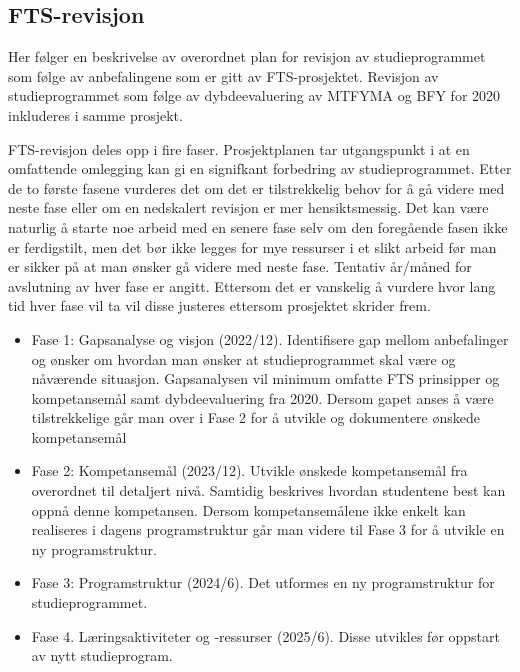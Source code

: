 \subsection{FTS-revisjon}
Her følger en beskrivelse av overordnet plan for revisjon av studieprogrammet som følge av anbefalingene som er gitt av FTS-prosjektet. Revisjon av studieprogrammet som følge av dybdeevaluering av MTFYMA og BFY for 2020 inkluderes i samme prosjekt.

FTS-revisjon deles opp i fire faser. Prosjektplanen tar utgangspunkt i at en omfattende omlegging kan gi en signifkant forbedring av studieprogrammet. Etter de to første fasene vurderes det om det er tilstrekkelig behov for å gå videre med neste fase eller om en nedskalert revisjon er mer hensiktsmessig. Det kan være naturlig å starte noe arbeid med en senere fase selv om den foregående fasen ikke er ferdigstilt, men det bør ikke legges for mye ressurser i et slikt arbeid før man er sikker på at man ønsker gå videre med neste fase. Tentativ år/måned for avslutning av hver fase er angitt. Ettersom det er vanskelig å vurdere hvor lang tid hver fase vil ta vil disse justeres ettersom prosjektet skrider frem.

\begin{itemize}
	\item Fase 1: Gapsanalyse og visjon (2022/12). Identifisere gap mellom anbefalinger og ønsker om hvordan man ønsker at studieprogrammet skal være og nåværende situasjon. Gapsanalysen vil minimum omfatte FTS prinsipper og kompetansemål samt dybdeevaluering fra 2020. Dersom gapet anses å være tilstrekkelige går man over i Fase 2 for å utvikle og dokumentere ønskede kompetansemål
	\item Fase 2: Kompetansemål (2023/12). Utvikle ønskede kompetansemål fra overordnet til detaljert nivå. Samtidig beskrives hvordan studentene best kan oppnå denne kompetansen. Dersom kompetansemålene ikke enkelt kan realiseres i dagens programstruktur går man videre til Fase 3 for å utvikle en ny programstruktur.
	\item Fase 3: Programstruktur (2024/6). Det utformes en ny programstruktur for studieprogrammet.
	\item Fase 4. Læringsaktiviteter og -ressurser (2025/6). Disse utvikles før oppstart av nytt studieprogram.
\end{itemize}


